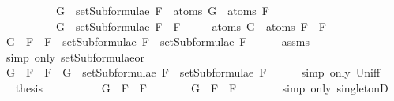 \begin{isabellebody}
\ \ \ \ \ \ \ \ \ \ {\isachardoublequoteopen}G\ {\isasymin}\ setSubformulae\ F{}\ {\isasymLongrightarrow}\ atoms\ G\ {\isasymsubseteq}\ atoms\ F{}{\isachardoublequoteclose}\isanewline
\ \ \ \ \ \ \ \ \ \ {\isachardoublequoteopen}G\ {\isasymin}\ setSubformulae\ {\isacharparenleft}F{}\ \isactrlbold {\isasymor}\ F{}{\isacharparenright}{\isachardoublequoteclose}\isanewline
\ \ \ \ \ {\isachardoublequoteopen}atoms\ G\ {\isasymsubseteq}\ atoms\ {\isacharparenleft}F{}\ \isactrlbold {\isasymor}\ F{}{\isacharparenright}{\isachardoublequoteclose}\isanewline
%
\isadelimproof
%
\endisadelimproof
%
\isatagproof
{}\isamarkupfalse%
\ {\isacharminus}\isanewline
\ \ \isamarkupfalse%
\ {\isachardoublequoteopen}G\ {\isasymin}\ {\isacharbraceleft}F{}\ \isactrlbold {\isasymor}\ F{}{\isacharbraceright}\ {\isasymunion}\ {\isacharparenleft}setSubformulae\ F{}\ {\isasymunion}\ setSubformulae\ F{}{\isacharparenright}{\isachardoublequoteclose}\isanewline
\ \ \ \ \isamarkupfalse%
\ assms{\isacharparenleft}{}{\isacharparenright}\ \isanewline
\ \ \ \ \isamarkupfalse%
\ {\isacharparenleft}simp\ only{\isacharcolon}\ setSubformulae{\isacharunderscore}or{\isacharparenright}\isanewline
\ \ \isamarkupfalse%
\ \isamarkupfalse%
\ {\isachardoublequoteopen}G\ {\isasymin}\ {\isacharbraceleft}F{}\ \isactrlbold {\isasymor}\ F{}{\isacharbraceright}\ {\isasymor}\ G\ {\isasymin}\ setSubformulae\ F{}\ {\isasymunion}\ setSubformulae\ F{}{\isachardoublequoteclose}\isanewline
\ \ \ \ \isamarkupfalse%
\ {\isacharparenleft}simp\ only{\isacharcolon}\ Un{\isacharunderscore}iff{\isacharparenright}\isanewline
\ \ \isamarkupfalse%
\ \isamarkupfalse%
\ {\isacharquery}thesis\isanewline
\ \ \isamarkupfalse%
\ \isanewline
\ \ \ \ \isamarkupfalse%
\ {\isachardoublequoteopen}G\ {\isasymin}\ {\isacharbraceleft}F{}\ \isactrlbold {\isasymor}\ F{}{\isacharbraceright}{\isachardoublequoteclose}\isanewline
\ \ \ \ \isamarkupfalse%
\ \isamarkupfalse%
\ {\isachardoublequoteopen}G\ {\isacharequal}\ F{}\ \isactrlbold {\isasymor}\ F{}{\isachardoublequoteclose}\isanewline
\ \ \ \ \ \ \isamarkupfalse%
\ {\isacharparenleft}simp\ only{\isacharcolon}\ singletonD{\isacharparenright}\isanewline

\end{isabellebody}
